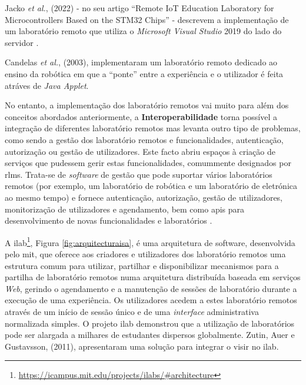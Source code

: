 Jacko \textit{et al.}, (2022) - no seu artigo ``Remote IoT Education Laboratory for Microcontrollers Based on the STM32 Chips'' - descrevem a implementação de um \acrshort{laboratório remoto} que utiliza o \textit{Microsoft Visual Studio} 2019 do lado do servidor \cite{jacko}.

Candelas \textit{et al.}, (2003), implementaram um \acrshort{laboratório remoto} dedicado ao ensino da robótica em que a ``ponte'' entre a experiência e o utilizador é feita atráves de \textit{Java Applet}.

No entanto, a implementação dos \acrshort{laboratório remoto}s vai muito para além dos conceitos abordados anteriormente, a \textbf{Interoperabilidade} torna possível a integração de diferentes \acrshort{laboratório remoto}s mas levanta outro tipo de problemas, como sendo a gestão dos \acrshort{laboratório remoto}s e funcionalidades, autenticação, autorização ou gestão de utilizadores. Este facto abriu espaços à criação de serviços que pudessem gerir estas funcionalidades, comummente designados por \acrfull{rlms}. Trata-se de \textit{software} de gestão que pode suportar vários laboratórios remotos (por exemplo, um laboratório de robótica e um laboratório de eletrónica ao mesmo tempo) e fornece autenticação, autorização, gestão de utilizadores, monitorização de utilizadores e agendamento, bem como \acrfull{api}s para desenvolvimento de novas funcionalidades e laboratórios \cite{Vocabulariog4l}.

A \acrfull{ilab}\footnote{\url{https://icampus.mit.edu/projects/ilabs/\#architecture}}, Figura \ref{fig:arquitecturaisa}, é uma arquitetura de software, desenvolvida pelo \acrfull{mit}, que oferece aos criadores e utilizadores dos \acrshort{laboratório remoto}s uma estrutura comum para utilizar, partilhar e disponibilizar mecanismos para a partilha de \acrshort{laboratório remoto}s numa arquitetura distribuída baseada em serviços \textit{Web}, gerindo o agendamento e a manutenção de sessões de laboratório durante a execução de uma experiência\cite{zutin}. Os utilizadores acedem a estes \acrshort{laboratório remoto}s através de um início de sessão único e de uma \textit{interface} administrativa normalizada simples. O projeto \acrshort{ilab} demonstrou que a utilização de laboratórios pode ser alargada a milhares de estudantes dispersos globalmente\cite{harward}\cite{arquitecturaisa}. Zutin, Auer e Gustavsson, (2011), apresentaram uma solução para integrar o \acrshort{visir} no \acrshort{ilab}\cite{zutinvisir}.

